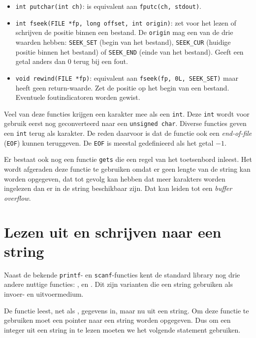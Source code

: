 \begin{itemize}[]
\item \texttt{int putchar(int ch)}: is equivalent aan \texttt{fputc(ch, stdout)}.
\item \texttt{int fseek(FILE *fp, long offset, int origin)}: zet voor het lezen of schrijven de positie binnen een bestand. De \texttt{origin} mag een van de drie waarden hebben: \texttt{SEEK\_SET} (begin van het bestand), \texttt{SEEK\_CUR} (huidige positie binnen het bestand) of \texttt{SEEK\_END} (einde van het bestand). Geeft een getal anders dan 0 terug bij een fout.
\item \texttt{void rewind(FILE *fp)}: equivalent aan \texttt{fseek(fp, 0L, SEEK\_SET)} maar heeft geen return-waarde. Zet de positie op het begin van een bestand. Eventuele foutindicatoren worden gewist.
\end{itemize}

Veel van deze functies krijgen een karakter mee als een \texttt{int}. Deze \texttt{int} wordt voor gebruik eerst nog geconverteerd naar een \texttt{unsigned char}. Diverse functies geven een \texttt{int} terug als karakter. De reden daarvoor is dat de functie ook een \textsl{end-of-file} (\texttt{EOF}) kunnen teruggeven. De \texttt{EOF} is meestal gedefinieerd als het getal $-1$.

Er bestaat ook nog een functie \texttt{gets} die een regel van het toetsenbord inleest. Het wordt afgeraden deze functie te gebruiken omdat er geen lengte van de string kan worden opgegeven, dat tot gevolg kan hebben dat meer karakters worden ingelezen dan er in de string beschikbaar zijn. Dat kan leiden tot een \textsl{buffer overflow}.


\section{Lezen uit en schrijven naar een string}
\label{sec:lezenschrijvenstring}
Naast de bekende \texttt{printf}- en \texttt{scanf}-functies kent de standard library nog drie andere nuttige functies: ,  en . Dit zijn varianten die een string gebruiken als invoer- en uitvoermedium.

De functie  leest, net als , gegevens in, maar nu uit een string. Om deze functie te gebruiken moet een pointer naar een string worden opgegeven. Dus om een integer uit een string in te lezen moeten we het volgende statement gebruiken.

